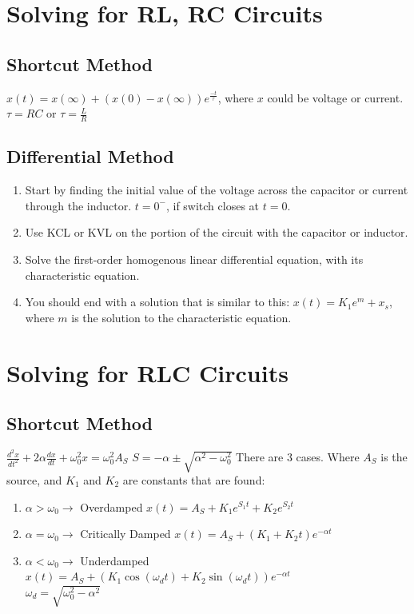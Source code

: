 \documentclass[10pt,letterpaper,twoside,notitlepage]{article}
\begin{document}
\section*{Solving for RL, RC Circuits}
	\subsection*{Shortcut Method}
		$x(t)=x(\infty )+(x(0)-x(\infty ))e^\frac{-t}{\tau}$, where $x$ could be voltage or current. \newline
		$\tau = RC$ or $\tau = \frac{L}{R}$
	\subsection*{Differential Method}
		\begin{enumerate}
			\item Start by finding the initial value of the voltage across the capacitor or current through the inductor. $t=0^-$, if switch closes at $t=0$.
			\item Use KCL or KVL on the portion of the circuit with the capacitor or inductor. 
			\item Solve the first-order homogenous linear differential equation, with its characteristic equation.
			\item You should end with a solution that is similar to this: $x(t)=K_1e^m + x_s$, where $m$ is the solution to the characteristic equation.
		\end{enumerate}
\section*{Solving for RLC Circuits}
	\subsection*{Shortcut Method}
		$\frac{d^2x}{dt^2}+2\alpha\frac{dx}{dt}+\omega_0^2x=\omega_0^2A_S$ \newline \newline
		$S = -\alpha \pm \sqrt{\alpha^2-\omega_0^2}$ \newline
		There are 3 cases. \newline
		Where $A_S$ is the source, and $K_1$ and $K_2$ are constants that are found:
		\begin{enumerate}
			\item $\alpha > \omega_0 \longrightarrow$ Overdamped \newline
				$x(t)=A_S+K_1e^{S_{1}t}+K_2e^{S_{2}t}$
			\item $\alpha = \omega_0 \longrightarrow$ Critically Damped \newline
				$x(t)=A_S+\left(K_1+K_2t\right)e^{-\alpha t}$
			\item $\alpha < \omega_0 \longrightarrow$ Underdamped \newline
				$x(t)=A_S+\left(K_1\cos(\omega_d t)+K_2\sin(\omega_d t)\right)e^{-\alpha t}$ \\
				$\omega_d=\sqrt{\omega_0^2-\alpha^2}$
		\end{enumerate}
\end{document}
